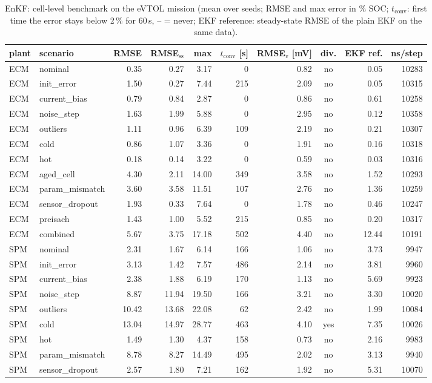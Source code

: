 \begin{table}[H]\centering\footnotesize\setlength{\tabcolsep}{4pt}
\caption{EnKF: cell-level benchmark on the eVTOL mission (mean over seeds; RMSE and max error in \% SOC; $t_\mathrm{conv}$: first time the error stays below 2\,\% for 60\,s, -- = never; EKF reference: steady-state RMSE of the plain EKF on the same data).}\label{tab:cell_EnKF}
\begin{tabular}{llrrrrrcrr}\toprule
plant & scenario & RMSE & RMSE$_\mathrm{ss}$ & max & $t_\mathrm{conv}$ [s] & RMSE$_v$ [mV] & div. & EKF ref. & ns/step \\ \midrule
ECM & nominal & 0.35 & 0.27 & 3.17 & 0 & 0.82 & no & 0.05 & 10283 \\
ECM & init\_error & 1.50 & 0.27 & 7.44 & 215 & 2.09 & no & 0.05 & 10315 \\
ECM & current\_bias & 0.79 & 0.84 & 2.87 & 0 & 0.86 & no & 0.61 & 10258 \\
ECM & noise\_step & 1.63 & 1.99 & 5.88 & 0 & 2.95 & no & 0.12 & 10358 \\
ECM & outliers & 1.11 & 0.96 & 6.39 & 109 & 2.19 & no & 0.21 & 10307 \\
ECM & cold & 0.86 & 1.07 & 3.36 & 0 & 1.91 & no & 0.16 & 10318 \\
ECM & hot & 0.18 & 0.14 & 3.22 & 0 & 0.59 & no & 0.03 & 10316 \\
ECM & aged\_cell & 4.30 & 2.11 & 14.00 & 349 & 3.58 & no & 1.52 & 10293 \\
ECM & param\_mismatch & 3.60 & 3.58 & 11.51 & 107 & 2.76 & no & 1.36 & 10259 \\
ECM & sensor\_dropout & 1.93 & 0.33 & 7.64 & 0 & 1.78 & no & 0.46 & 10247 \\
ECM & preisach & 1.43 & 1.00 & 5.52 & 215 & 0.85 & no & 0.20 & 10317 \\
ECM & combined & 5.67 & 3.75 & 17.18 & 502 & 4.40 & no & 12.44 & 10191 \\
\midrule
SPM & nominal & 2.31 & 1.67 & 6.14 & 166 & 1.06 & no & 3.73 & 9947 \\
SPM & init\_error & 3.13 & 1.42 & 7.57 & 486 & 2.14 & no & 3.81 & 9960 \\
SPM & current\_bias & 2.38 & 1.88 & 6.19 & 170 & 1.13 & no & 5.69 & 9923 \\
SPM & noise\_step & 8.87 & 11.94 & 19.50 & 166 & 3.21 & no & 3.30 & 10020 \\
SPM & outliers & 10.42 & 13.68 & 22.08 & 62 & 2.42 & no & 1.99 & 10084 \\
SPM & cold & 13.04 & 14.97 & 28.77 & 463 & 4.10 & yes & 7.35 & 10026 \\
SPM & hot & 1.49 & 1.30 & 4.37 & 158 & 0.73 & no & 2.16 & 9983 \\
SPM & param\_mismatch & 8.78 & 8.27 & 14.49 & 495 & 2.02 & no & 3.13 & 9940 \\
SPM & sensor\_dropout & 2.57 & 1.80 & 7.21 & 162 & 1.92 & no & 5.31 & 10070 \\
\bottomrule\end{tabular}\end{table}
